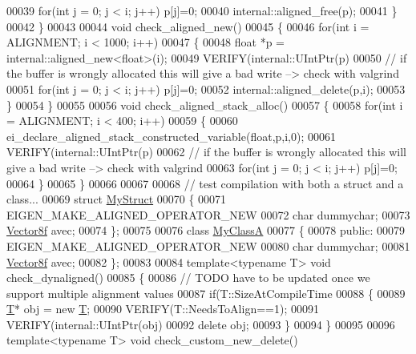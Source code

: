 \begin{DoxyCode}
00039     \textcolor{keywordflow}{for}(\textcolor{keywordtype}{int} j = 0; j < i; j++) p[j]=0;
00040     internal::aligned\_free(p);
00041   \}
00042 \}
00043 
00044 \textcolor{keywordtype}{void} check\_aligned\_new()
00045 \{
00046   \textcolor{keywordflow}{for}(\textcolor{keywordtype}{int} i = ALIGNMENT; i < 1000; i++)
00047   \{
00048     \textcolor{keywordtype}{float} *p = internal::aligned\_new<float>(i);
00049     VERIFY(internal::UIntPtr(p)%
00050     \textcolor{comment}{// if the buffer is wrongly allocated this will give a bad write --> check with valgrind}
00051     \textcolor{keywordflow}{for}(\textcolor{keywordtype}{int} j = 0; j < i; j++) p[j]=0;
00052     internal::aligned\_delete(p,i);
00053   \}
00054 \}
00055 
00056 \textcolor{keywordtype}{void} check\_aligned\_stack\_alloc()
00057 \{
00058   \textcolor{keywordflow}{for}(\textcolor{keywordtype}{int} i = ALIGNMENT; i < 400; i++)
00059   \{
00060     ei\_declare\_aligned\_stack\_constructed\_variable(\textcolor{keywordtype}{float},p,i,0);
00061     VERIFY(internal::UIntPtr(p)%
00062     \textcolor{comment}{// if the buffer is wrongly allocated this will give a bad write --> check with valgrind}
00063     \textcolor{keywordflow}{for}(\textcolor{keywordtype}{int} j = 0; j < i; j++) p[j]=0;
00064   \}
00065 \}
00066 
00067 
00068 \textcolor{comment}{// test compilation with both a struct and a class...}
00069 \textcolor{keyword}{struct }\hyperlink{struct_my_struct}{MyStruct}
00070 \{
00071   EIGEN\_MAKE\_ALIGNED\_OPERATOR\_NEW
00072   \textcolor{keywordtype}{char} dummychar;
00073   \hyperlink{group___core___module}{Vector8f} avec;
00074 \};
00075 
00076 \textcolor{keyword}{class }\hyperlink{class_my_class_a}{MyClassA}
00077 \{
00078   \textcolor{keyword}{public}:
00079     EIGEN\_MAKE\_ALIGNED\_OPERATOR\_NEW
00080     \textcolor{keywordtype}{char} dummychar;
00081     \hyperlink{group___core___module}{Vector8f} avec;
00082 \};
00083 
00084 \textcolor{keyword}{template}<\textcolor{keyword}{typename} T> \textcolor{keywordtype}{void} check\_dynaligned()
00085 \{
00086   \textcolor{comment}{// TODO have to be updated once we support multiple alignment values}
00087   \textcolor{keywordflow}{if}(T::SizeAtCompileTime %
00088   \{
00089     \hyperlink{group___sparse_core___module}{T}* obj = \textcolor{keyword}{new} \hyperlink{group___sparse_core___module}{T};
00090     VERIFY(T::NeedsToAlign==1);
00091     VERIFY(internal::UIntPtr(obj)%
00092     \textcolor{keyword}{delete} obj;
00093   \}
00094 \}
00095 
00096 \textcolor{keyword}{template}<\textcolor{keyword}{typename} T> \textcolor{keywordtype}{void} check\_custom\_new\_delete()

\end{DoxyCode}
